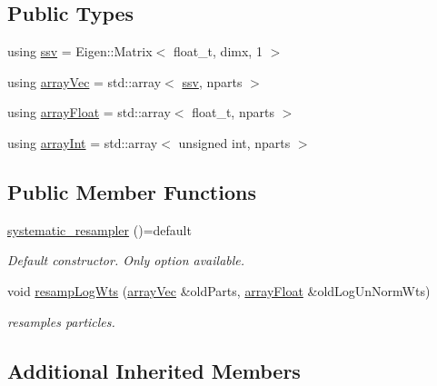 \subsection*{Public Types}
\begin{DoxyCompactItemize}
\item 
using \hyperlink{classsystematic__resampler_a9e158fbf5875f93e9cb4da562928e649}{ssv} = Eigen\+::\+Matrix$<$ float\+\_\+t, dimx, 1 $>$
\item 
using \hyperlink{classsystematic__resampler_a89263b385b61687341d67a717da78dc1}{array\+Vec} = std\+::array$<$ \hyperlink{classrbase_ae20e0b8df15aa109252f57ecbf1f20f8}{ssv}, nparts $>$
\item 
using \hyperlink{classsystematic__resampler_ae3f8e7d5687c068b7fc320fe4ee67871}{array\+Float} = std\+::array$<$ float\+\_\+t, nparts $>$
\item 
using \hyperlink{classsystematic__resampler_afbdf5779938dfee726f87d31040284de}{array\+Int} = std\+::array$<$ unsigned int, nparts $>$
\end{DoxyCompactItemize}
\subsection*{Public Member Functions}
\begin{DoxyCompactItemize}
\item 
\mbox{\label{classsystematic__resampler_a6422f70f1f5315d16b018cb855435511}} 
\hyperlink{classsystematic__resampler_a6422f70f1f5315d16b018cb855435511}{systematic\+\_\+resampler} ()=default
\begin{DoxyCompactList}\small\item\em Default constructor. Only option available. \end{DoxyCompactList}\item 
void \hyperlink{classsystematic__resampler_a9467aec6002043f35f40e9e4857021ed}{resamp\+Log\+Wts} (\hyperlink{classrbase_aa12fc826befa6ba0647b5f59ebc396ee}{array\+Vec} \&old\+Parts, \hyperlink{classrbase_a6f76bef853e508cb5b6f546d231b06f5}{array\+Float} \&old\+Log\+Un\+Norm\+Wts)
\begin{DoxyCompactList}\small\item\em resamples particles. \end{DoxyCompactList}\end{DoxyCompactItemize}
\subsection*{Additional Inherited Members}


